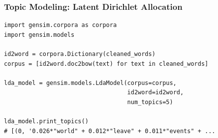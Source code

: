 
\begin{frame}[fragile]
\frametitle{Topic Modeling: Latent Dirichlet Allocation}

\begin{verbatim}
import gensim.corpora as corpora
import gensim.models

id2word = corpora.Dictionary(cleaned_words)
corpus = [id2word.doc2bow(text) for text in cleaned_words]

lda_model = gensim.models.LdaModel(corpus=corpus,
                                   id2word=id2word,
                                   num_topics=5)

lda_model.print_topics()
# [(0, '0.026*"world" + 0.012*"leave" + 0.011*"events" + ...
\end{verbatim}
\end{frame}
